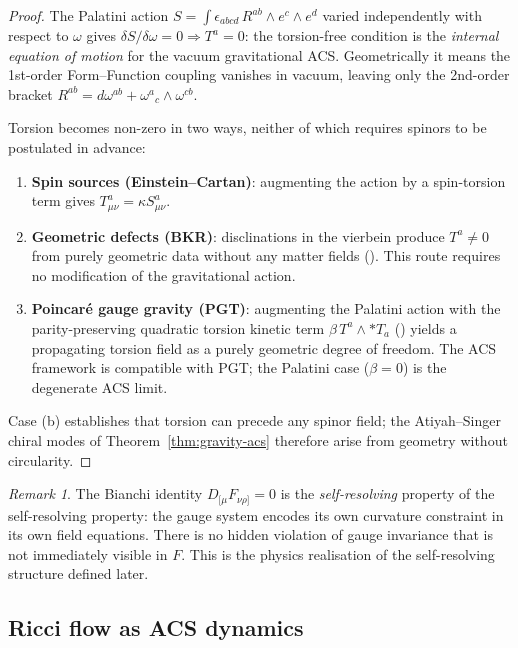 \documentclass[11pt,a4paper]{article}
\theoremstyle{plain}
\theoremstyle{definition}
\theoremstyle{remark}
\newtheorem{remark}[theorem]{Remark}
\begin{document}
\begin{proof}
The Palatini action $S = \int \epsilon_{abcd}\, R^{ab} \wedge e^c \wedge e^d$
varied independently with respect to $\omega$ gives $\delta S/\delta\omega = 0
\Rightarrow T^a = 0$: the torsion-free condition is the \emph{internal equation
of motion} for the vacuum gravitational ACS.  Geometrically it means the
1st-order Form--Function coupling vanishes in vacuum, leaving only the
2nd-order bracket $R^{ab} = d\omega^{ab} + \omega^a{}_c\wedge\omega^{cb}$.

Torsion becomes non-zero in two ways, neither of which requires spinors
to be postulated in advance:
\begin{enumerate}[noitemsep,label=(\alph*)]
  \item \textbf{Spin sources (Einstein--Cartan)}: augmenting the action by
    a spin-torsion term gives $T^a_{\mu\nu} = \kappa S^a_{\mu\nu}$.
  \item \textbf{Geometric defects (BKR)}: disclinations in the vierbein produce
    $T^a \neq 0$ from purely geometric data without any matter fields
    (\cite{BKR1955}).  This route requires no
    modification of the gravitational action.
  \item \textbf{Poincar\'{e} gauge gravity (PGT)}: augmenting the Palatini action
    with the parity-preserving quadratic torsion kinetic term
    $\beta\,T^a\wedge{*T_a}$ (\cite{Kibble1961,Sciama1964,Hehl1976})
    yields a propagating torsion field as a purely geometric degree of freedom.
    The ACS framework is compatible with PGT; the Palatini case ($\beta=0$)
    is the degenerate ACS limit.
\end{enumerate}
Case (b) establishes that torsion can precede any spinor field; the
Atiyah--Singer chiral modes of Theorem~\ref{thm:gravity-acs} therefore
arise from geometry without circularity.
\end{proof}

\begin{remark}
The Bianchi identity $D_{[\mu}F_{\nu\rho]} = 0$ is the \emph{self-resolving} 
property of the self-resolving property: the gauge system encodes its 
own curvature constraint in its own field equations.  
There is no hidden violation of gauge invariance that is not 
immediately visible in $F$.  This is the physics realisation of the 
self-resolving structure defined later.
\end{remark}

\subsection{Ricci flow as ACS dynamics}
\end{document}
